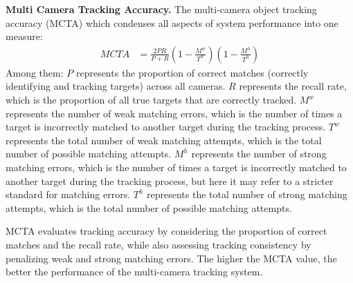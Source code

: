 \textbf{Multi Camera Tracking Accuracy.}
The multi-camera object tracking accuracy (MCTA) which condenses all aspects of system performance into one measure\cite{Alpher23b}:
\begin{align}
	\mathit{MCTA} & = \frac{2 P R}{P+R}\left(1-\frac{M^{w}}{T^{w}}\right)\left(1-\frac{M^{h}}{T^{h}}\right)
\end{align}
Among them:
$P$ represents the proportion of correct matches (correctly identifying and tracking targets) across all cameras.  
$R$ represents the recall rate, which is the proportion of all true targets that are correctly tracked.  
$M^{w}$ represents the number of weak matching errors, which is the number of times a target is incorrectly matched to another target during the tracking process.  
$T^{w}$ represents the total number of weak matching attempts, which is the total number of possible matching attempts.  
$M^{h}$ represents the number of strong matching errors, which is the number of times a target is incorrectly matched to another target during the tracking process, but here it may refer to a stricter standard for matching errors.  
$T^{h}$ represents the total number of strong matching attempts, which is the total number of possible matching attempts.

MCTA evaluates tracking accuracy by considering the proportion of correct matches and the recall rate, while also assessing tracking consistency by penalizing weak and strong matching errors. 
The higher the MCTA value, the better the performance of the multi-camera tracking system.
